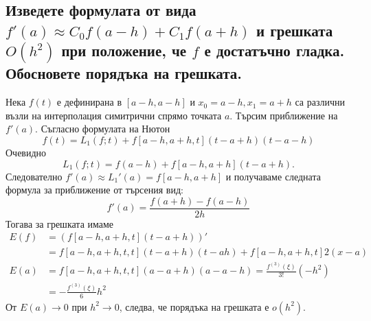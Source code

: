 \documentclass[12pt]{article}
\numberwithin{equation}{subsection}
\numberwithin{theorem}{subsection}
\numberwithin{definition}{subsection}
\numberwithin{corollary}{subsection}
\begin{document}
\subsection{Изведете формулата от вида $f'(a)\approx C_0 f(a - h) + C_1 f(a + h)$ и грешката $O(h^2)$ при положение, че $f$ е достатъчно гладка.
        Обосновете порядъка на грешката.}
  Нека $f(t)$ е дефинирана в $[a-h,a-h]$ и $x_0=a-h,x_1=a+h$  са различни възли на интерполация симитрични спрямо точката $a$. Търсим приближение на $f'(a)$.
  Съгласно формулата на Нютон
  \begin{equation*}
    f(t) = L_1(f;t)+f[a-h,a+h,t](t-a+h)(t-a-h)
  \end{equation*}
  Очевидно 
  \begin{equation*}
    L_1(f;t)=f(a-h)+f[a-h,a+h](t-a+h).
  \end{equation*}
  Следователно $f'(a)\approx L_1'(a)=f[a-h,a+h]$ и получаваме следната формула за приближение от търсения вид:
  \begin{equation*}
    f'(a)=\frac{f(a+h)-f(a-h)}{2h}
  \end{equation*}
  Тогава за грешката имаме 
  \begin{align*}
    E(f) &=(f[a-h,a+h,t](t-a+h))'\\
         &=f[a-h,a+h,t,t](t-a+h)(t-ah) + f[a-h,a+h,t]2(x-a)\\
    E(a) &=f[a-h,a+h,t,t](a-a+h)(a-a-h) = \frac{f^{(3)}(\xi)}{3!}(-h^2)\\
         &=\boxed{-\frac{f^{(3)}(\xi)}{6}h^2}
  \end{align*}
  От $E(a)\to0$ при $h^2\to0$, следва, че порядъка на грешката е $o(h^2)$.
\end{document}
